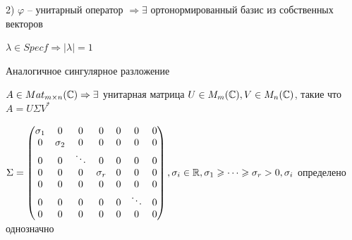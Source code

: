2) $\varphi$ -- унитарный оператор $\Rightarrow \exists$ ортонормированный базис из собственных векторов

$\lambda \in Spec f \Rightarrow |\lambda| = 1$

\vspace{\baselineskip}
Аналогичное сингулярное разложение

\vspace{\baselineskip}
$A \in Mat_{m \times n} (\mathbb{C}) \Rightarrow \exists$ унитарная матрица $U \in M_m(\mathbb{C}), V \in M_n (\mathbb{C})$, такие что $A = U \Sigma V^*$

$\Sigma = \begin{pmatrix} \sigma_1 & 0 & 0 & 0 & 0 & 0 & 0 \\  0 & \sigma_2 & 0 & 0 & 0 & 0 & 0 \\ 0 & 0 & \ddots & 0 & 0 & 0 & 0 \\ 0 & 0 & 0 & \sigma_r & 0 & 0 & 0 \\ 0 & 0 & 0 & 0 & 0 & 0 & 0 \\ 0 & 0 & 0 & 0 & 0 & \ddots & 0 \\ 0 & 0 & 0 & 0 & 0 & 0 & 0 \end{pmatrix}, \sigma_i \in \mathbb{R}, \sigma_1 \geqslant \dots \geqslant \sigma_r > 0, \sigma_i$ определено однозначно 























